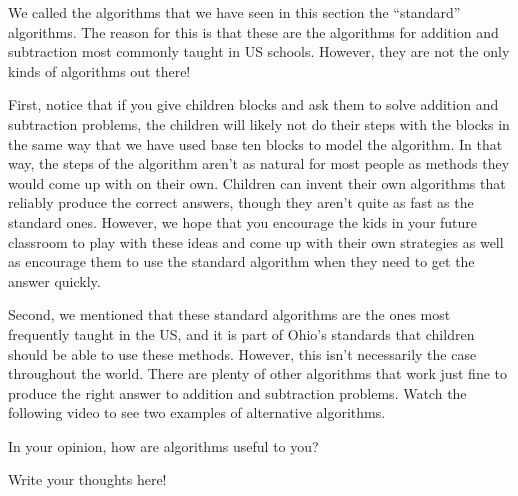 \documentclass{ximera}
\begin{document}
We called the algorithms that we have seen in this section the ``standard'' algorithms. The reason for this is that these are the algorithms for addition and subtraction most commonly taught in US schools. However, they are not the only kinds of algorithms out there!

First, notice that if you give children blocks and ask them to solve addition and subtraction problems, the children will likely not do their steps with the blocks in the same way that we have used base ten blocks to model the algorithm. In that way, the steps of the algorithm aren't as natural for most people as methods they would come up with on their own. Children can invent their own algorithms that reliably produce the correct answers, though they aren't quite as fast as the standard ones. However, we hope that you encourage the kids in your future classroom to play with these ideas and come up with their own strategies as well as encourage them to use the standard algorithm when they need to get the answer quickly.

Second, we mentioned that these standard algorithms are the ones most frequently taught in the US, and it is part of Ohio's standards that children should be able to use these methods. However, this isn't necessarily the case throughout the world. There are plenty of other algorithms that work just fine to produce the right answer to addition and subtraction problems. Watch the following video to see two examples of alternative algorithms.


\begin{question}
In your opinion, how are algorithms useful to you?
\begin{freeResponse}
Write your thoughts here!
\end{freeResponse}
\end{question}
\end{document}
